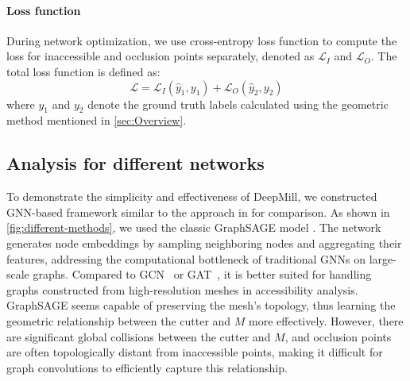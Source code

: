 \paragraph{Loss function}
During network optimization, we use cross-entropy loss function to compute the loss for inaccessible and occlusion points separately, denoted as $\mathcal{L}_I$ and $\mathcal{L}_O$. The total loss function is defined as:
\begin{equation}
\mathcal{L} =  \mathcal{L}_I(\hat{y}_1, y_1) +  \mathcal{L}_O(\hat{y}_2, y_2)
\end{equation}
where $y_1$ and $y_2$ denote the ground truth labels calculated using the geometric method mentioned in \autoref{sec:Overview}.




\subsection{Analysis for different networks}
\label{sec:analysis}
To demonstrate the simplicity and effectiveness of DeepMill, we constructed GNN-based framework similar to the approach in \cite{huang5065158hierarchical} for comparison. As shown in \autoref{fig:different-methods}, we used the classic GraphSAGE model \cite{hamilton2017inductive}. 
The network generates node embeddings by sampling neighboring nodes and aggregating their features, addressing the computational bottleneck of traditional GNNs on large-scale graphs. Compared to GCN~\cite{kipf2016semi} or GAT~\cite{velivckovic2017graph}, it is better suited for handling graphs constructed from high-resolution meshes in accessibility analysis.
GraphSAGE seems capable of preserving the mesh's topology, thus learning the geometric relationship between the cutter and $M$ more effectively. However, there are significant global collisions between the cutter and $M$, and occlusion points are often topologically distant from inaccessible points, making it difficult for graph convolutions to efficiently capture this relationship. 

